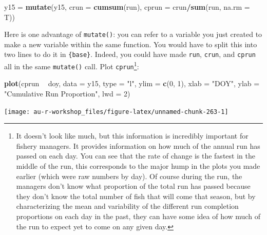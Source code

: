 \documentclass[]{book}
\newenvironment{Shaded}{\begin{snugshade}}{\end{snugshade}}
\newcommand{\KeywordTok}[1]{\textcolor[rgb]{0.13,0.29,0.53}{\textbf{#1}}}
\newcommand{\DataTypeTok}[1]{\textcolor[rgb]{0.13,0.29,0.53}{#1}}
\newcommand{\DecValTok}[1]{\textcolor[rgb]{0.00,0.00,0.81}{#1}}
\newcommand{\StringTok}[1]{\textcolor[rgb]{0.31,0.60,0.02}{#1}}
\newcommand{\OperatorTok}[1]{\textcolor[rgb]{0.81,0.36,0.00}{\textbf{#1}}}
\newcommand{\NormalTok}[1]{#1}
\let\rmarkdownfootnote\footnote%
\def\footnote{\protect\rmarkdownfootnote}
\theoremstyle{definition}
\theoremstyle{definition}
\theoremstyle{definition}
\theoremstyle{remark}
\begin{document}
\begin{Shaded}
\begin{Highlighting}[]
\NormalTok{y15 =}\StringTok{ }\KeywordTok{mutate}\NormalTok{(y15, }\DataTypeTok{crun =} \KeywordTok{cumsum}\NormalTok{(run), }\DataTypeTok{cprun =}\NormalTok{ crun}\OperatorTok{/}\KeywordTok{sum}\NormalTok{(run, }\DataTypeTok{na.rm =}\NormalTok{ T))}
\end{Highlighting}
\end{Shaded}

Here is one advantage of \texttt{mutate()}: you can refer to a variable
you just created to make a new variable within the same function. You
would have to split this into two lines to do it in \texttt{\{base\}}.
Indeed, you could have made \texttt{run}, \texttt{crun}, and
\texttt{cprun} all in the same \texttt{mutate()} call. Plot
\texttt{cprun}\footnote{It doesn't look like much, but this information
  is incredibly important for fishery managers. It provides information
  on how much of the annual run has passed on each day. You can see that
  the rate of change is the fastest in the middle of the run, this
  corresponds to the major hump in the plots you made earlier (which
  were raw numbers by day). Of course during the run, the managers don't
  know what proportion of the total run has passed because they don't
  know the total number of fish that will come that season, but by
  characterizing the mean and variability of the different run
  completion proportions on each day in the past, they can have some
  idea of how much of the run to expect yet to come on any given day.}:

\begin{Shaded}
\begin{Highlighting}[]
\KeywordTok{plot}\NormalTok{(cprun }\OperatorTok{~}\StringTok{ }\NormalTok{doy, }\DataTypeTok{data =}\NormalTok{ y15, }\DataTypeTok{type =} \StringTok{"l"}\NormalTok{, }\DataTypeTok{ylim =} \KeywordTok{c}\NormalTok{(}\DecValTok{0}\NormalTok{, }\DecValTok{1}\NormalTok{),}
     \DataTypeTok{xlab =} \StringTok{"DOY"}\NormalTok{, }\DataTypeTok{ylab =} \StringTok{"Cumulative Run Proportion"}\NormalTok{, }\DataTypeTok{lwd =} \DecValTok{2}\NormalTok{)}
\end{Highlighting}
\end{Shaded}

\begin{center}\texttt{[image: au-r-workshop\_files/figure-latex/unnamed-chunk-263-1]} \end{center}
\end{document}
